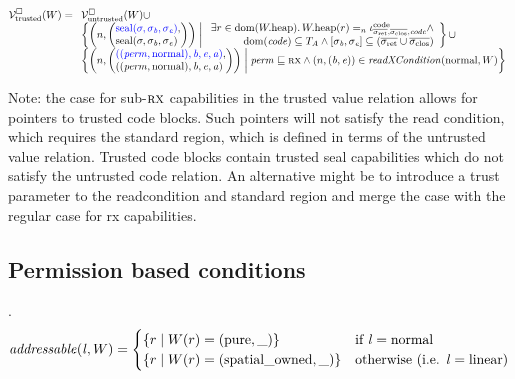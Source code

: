 \documentclass[a4paper]{article}
\begin{document}
\[
  \lrvtrusted(W) =
  \begin{array}[t]{l}
    \lrv(W)\cup \\
%
    \left\{ \npair{\left(\arraycolsep=0pt\array{l} \src{\seal{\sigma,\sigma_\baddr,\sigma_\eaddr}},\\ \seal{\sigma,\sigma_\baddr,\sigma_\eaddr} \endarray \right)} 
    \; \middle| \;
    \begin{array}{l}
      \exists r \in \dom(\pwheap) \ldotp \pwheap(r) =_n \codereg{\sigrets,\sigcloss,\code} \wedge\\
      \hfill\dom(\code) \subseteq \ta \wedge [\sigma_\baddr,\sigma_\eaddr] \subseteq (\sigrets\cup\sigcloss)
    \end{array}
    \right\} \cup \\
    \left\{ \npair{\left(\arraycolsep=0pt\array{l} \src{((\perm,\normal),\baddr,\eaddr,\aaddr)},\\ ((\perm,\normal),\baddr,\eaddr,\aaddr) \endarray \right)} \;\middle|\; 
      \perm \sqsubseteq \rx \wedge \npair{(\baddr,\eaddr)} \in \xReadCond{\normal,W}
    \right\}
  \end{array}
\]

Note: the case for sub-$\textsc{rx}$ capabilities in the trusted value relation allows for pointers to trusted code blocks.
Such pointers will not satisfy the read condition, which requires the standard region, which is defined in terms of the untrusted value relation.
Trusted code blocks contain trusted seal capabilities which do not satisfy the untrusted code relation.
An alternative might be to introduce a trust parameter to the readcondition and standard region and merge the case with the regular case for rx capabilities.

\subsection{Permission based conditions}
.
\[
  \addressable{\lin,W} =
  \begin{cases}
    \{ r \mid W(r) = (\pure,\_) \} & \text{if $\lin = \normal$} \\
    \{ r \mid W(r) = (\spatialo,\_) \}  & \text{otherwise (i.e. $\lin = \linear$)} \\
  \end{cases}
\]
\end{document}
